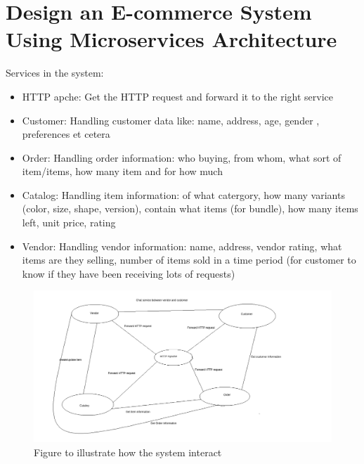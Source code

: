 \documentclass[11pt,a4paper]{article}
\begin{document}
	\section{Design an E-commerce System Using Microservices Architecture}
	Services in the system:
	\begin{itemize}
		\item HTTP apche: Get the HTTP request and forward it to the right service
		\item Customer: Handling customer data like: name, address, age, gender , preferences et cetera
		\item Order: Handling order information: who buying, from whom, what sort of item/items, how many item and for how much
		\item Catalog: Handling item information: of what catergory, how many variants (color, size, shape, version), contain what items (for bundle), how many items left, unit price, rating
		\item Vendor: Handling vendor information: name, address, vendor rating, what items are they selling, number of items sold in a time period (for customer to know if they have been receiving lots of requests)
	\end{itemize}
	\begin{figure}[h!]
  			\includegraphics[width=\linewidth]{e-comm.png}
  			\caption{Figure to illustrate how the system interact}
  			\label{fig:ecomm}
		\end{figure}
\end{document}
